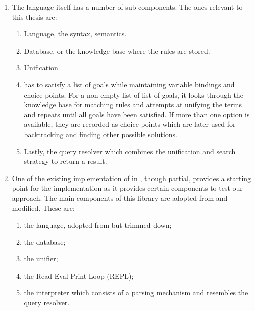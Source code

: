\documentclass[thesis-solanki.tex]{subfiles}
\begin{document}
\begin{enumerate}
\item {}

The language itself has a number of sub components.
The ones relevant to this thesis are:
\begin{enumerate}
\item Language, the syntax, semantics.

\item Database, or the knowledge base where the rules are stored.

\item Unification

\item
   has to satisfy a list of goals while maintaining variable bindings and choice points.
  For a non empty list of list of goals, it looks through the knowledge base for matching rules and attempts at
  unifying the terms and repeats until all goals have been satisfied.
  If more than one option is available, they are recorded as choice points which are later used for backtracking
  and finding other possible solutions.

\item
  Lastly, the query resolver which combines the unification and search strategy to return a result.
\end{enumerate}

\item {} \cite{prolog-lib}

  One of the existing implementation of  in , though partial, provides a starting
  point for the implementation as it provides
  certain components to test
  our approach.
  The main components of this library are adopted from  and modified. These are:

\begin{enumerate}
\item the language, adopted from  but trimmed down;

\item the database;

\item the unifier;

\item the Read-Eval-Print Loop (REPL);

\item the interpreter which consists of a parsing mechanism and resembles the query resolver.
\end{enumerate}


\end{enumerate}
\end{document}
